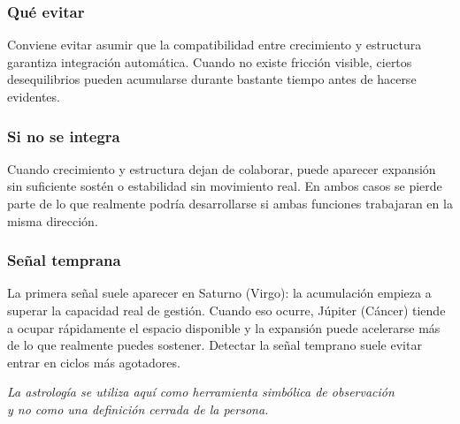 \documentclass[11pt,a4paper]{article}
\begin{document}
\subsubsection*{Qué evitar}

Conviene evitar asumir que la compatibilidad entre crecimiento y estructura garantiza integración automática. Cuando no existe fricción visible, ciertos desequilibrios pueden acumularse durante bastante tiempo antes de hacerse evidentes.

\subsubsection*{Si no se integra}

Cuando crecimiento y estructura dejan de colaborar, puede aparecer expansión sin suficiente sostén o estabilidad sin movimiento real. En ambos casos se pierde parte de lo que realmente podría desarrollarse si ambas funciones trabajaran en la misma dirección.

\subsubsection*{Señal temprana}

La primera señal suele aparecer en Saturno (Virgo): la acumulación empieza a superar la capacidad real de gestión. Cuando eso ocurre, Júpiter (Cáncer) tiende a ocupar rápidamente el espacio disponible y la expansión puede acelerarse más de lo que realmente puedes sostener. Detectar la señal temprano suele evitar entrar en ciclos más agotadores.

\vfill

\begin{center}
{\small\itshape\color{grisai}
La astrología se utiliza aquí como herramienta simbólica de observación\\
y no como una definición cerrada de la persona.
}
\end{center}
\end{document}
